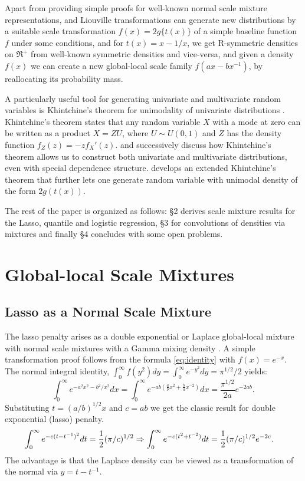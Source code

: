 \documentclass[lineno]{biometrika}
\begin{document}
Apart from providing simple proofs for well-known normal scale mixture representations, \CS and Liouville transformations can generate new distributions by a suitable scale transformation $f(x) = 2g\{ t(x) \}$ of a simple baseline function $f$ under some conditions, and for $t(x) = x - 1/x$, we get R-symmetric densities on $\Re^+$ from well-known symmetric densities and vice-versa, and given a density $f(x)$ we can create a new global-local scale family $f(ax-bx^{-1})$, by reallocating its probability mass. 

A particularly useful tool for generating univariate and multivariate random variables is Khintchine's theorem for unimodality of univariate distributions \citep{bryson1982constructing}. Khintchine's theorem states that any random variable $X$ with a mode at zero can be written as a product $X = ZU$, where $U \sim U(0,1)$ and $Z$ has the density function $f_Z(z) = -zf_{X}'(z)$. \citet{bryson1982constructing} and successively \citet{jones2012khintchine} discuss how Khintchine's theorem allows us to construct both univariate and multivariate distributions, even with special dependence structure.\cite{jones2014generating} develops an extended Khintchine's theorem that further lets one generate random variable with unimodal density of the form $2g(t(x))$. 

The rest of the paper is organized as follows: \S 2 derives scale mixture results for the Lasso, quantile and logistic regression, \S 3 for convolutions of densities via mixtures and finally \S 4 concludes with some open problems. 

\section{Global-local Scale Mixtures}
\subsection{Lasso as a Normal Scale Mixture}
The lasso penalty arises as a double exponential or Laplace global-local mixture with normal scale mixtures with a Gamma mixing density \citep{andrews1974scale}. A simple transformation proof follows from the \CS formula \eqref{eq:identity} with $ f(x) = e^{-x} $. The normal integral identity, $ \int_{0}^{\infty} f(y^2) dy = \int_0^\infty e^{-y^2} d y = {\pi}^{1/2}/2 $ yields: 
$$
\int_0^\infty e^{- a^2 x^2 - b^2 / x^2 } d x = \int_0^{\infty} e^{-ab \left( \frac{a}{b} x^2 + \frac{b}{a}x^{-2} \right)} dx =  \frac{{\pi}^{1/2}}{2a} e^{- 2 ab}.
$$
Substituting $ t = (a/b)^{1/2} x $ and $c = ab$ we get the classic \citet{andrews1974scale} result for double exponential (lasso) penalty.  
\begin{align*}
  \int_0^\infty e^{- c (t - t^{-1})^2} d t & = \half (\pi/c)^{1/2} \Rightarrow \int_0^\infty e^{- c (t^2 + t^{-2})} d t = \half (\pi/c)^{1/2} e^{-2c}. %
\end{align*}
The advantage is that the Laplace density can be viewed as a transformation of the normal via $y = t - t^{-1}$.
\end{document}
